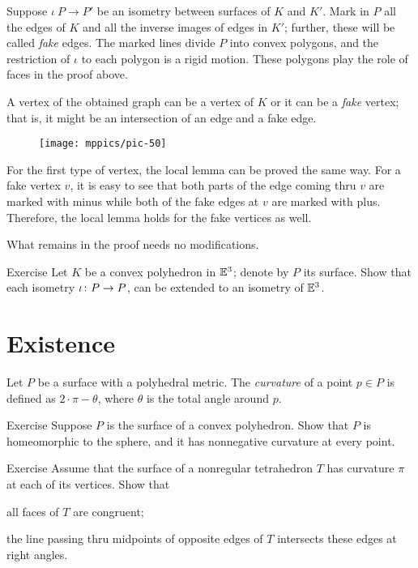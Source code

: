 Suppose $\iota\:P\to P'$ be an isometry between surfaces of $K$ and $K'$.
Mark in $P$ all the edges of $K$ and all the inverse images of edges in $K'$; further, these will be called \emph{fake} edges.
The marked lines divide $P$ into convex polygons, and the restriction of $\iota$ to each polygon is a rigid motion.
These polygons play the role of faces in the proof above.

A vertex of the obtained graph can be a vertex of $K$ or it can be a \emph{fake} vertex;
that is, it might be an intersection of an edge and a fake edge.

\begin{figure}[ht!]
\vskip-0mm
\centering
\texttt{[image: mppics/pic-50]}
\vskip-0mm
\end{figure}

For the first type of vertex, the local lemma can be proved the same way. 
For a fake vertex $v$, it is easy to see that both parts of the edge coming thru $v$ are marked with minus
while both of the fake edges at $v$ are marked with plus.
Therefore, the local lemma holds for the fake vertices as well.

What remains in the proof needs no modifications.
\qeds

\begin{thm}{Exercise}\label{pr:K-P-simmetry}
Let $K$ be a convex polyhedron in $\mathbb{E}^3$;
denote by $P$ its surface.
Show that each isometry $\iota\:P\z\to P$,
can be extended to an isometry of $\mathbb{E}^3$. 
\end{thm}

\section{Existence}\label{sec:Alexandrov-existence}

Let $P$ be a surface with a polyhedral metric.
The \emph{curvature} of a point $p\in P$ is defined as $2\cdot \pi -\theta$,
where $\theta$ is the total angle around $p$.

\begin{thm}{Exercise}\label{ex:sphere-with-pos}
Suppose $P$ is the surface of a convex polyhedron.
Show that $P$ is homeomorphic to the sphere, and it has nonnegative curvature at every point.
\end{thm}

\begin{thm}{Exercise}\label{pr:tetrahedron} 
Assume that the surface of a nonregular tetrahedron $T$ has curvature $\pi$ at each of its vertices.
Show that 

\begin{subthm}{}
all faces of $T$ are congruent; 
\end{subthm}

\begin{subthm}{} the line passing thru midpoints of opposite edges of $T$ intersects these edges at right angles.
\end{subthm}
 
\end{thm}

